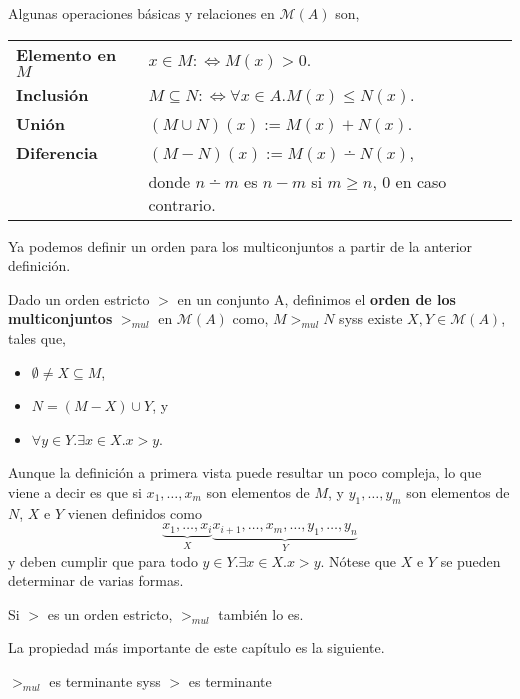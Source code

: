 \begin{defi} 
  Algunas operaciones básicas y relaciones en $\mathcal{M}(A)$ son, \\
  \begin{tabular}{ll}
    \textbf{Elemento en $M$}
    & $x \in M :\Leftrightarrow M(x) > 0$. \\
    \textbf{Inclusión}     
    & $M \subseteq N :\Leftrightarrow \forall x \in A. M(x) \leq N(x)$. \\ 
    \textbf{Unión}        
    & $(M \cup N)(x) := M(x) + N(x)$.   \\ 
    \textbf{Diferencia}   
    & $(M - N)(x):= M(x) \dotminus N(x)$, \\ 
    & donde $n \dotminus m$ es $n-m$
      si $m \geq n$, 0 en caso contrario.     
  \end{tabular}
\end{defi}

Ya podemos definir un orden para los multiconjuntos a partir de la anterior
definición.

\begin{defi} 
  Dado un orden estricto $>$ en un conjunto A, definimos el \textbf{orden de los
  multiconjuntos} $>_{mul}$ en $\mathcal{M}(A)$ como, $M >_{mul} N$ syss existe
  $X, Y \in \mathcal{M}(A)$, tales que,
  \begin{itemize}
  \item $\emptyset \neq X \subseteq M$,
  \item $N = (M - X) \cup Y$, y 
  \item $\forall y \in Y. \exists x \in X. x>y$.
  \end{itemize}
\end{defi}

Aunque la definición a primera vista puede resultar un poco compleja, lo que
viene a decir es que si $x_1, \dots, x_m$ son elementos de $M$, y
$y_1, \dots, y_m$ son elementos de $N$, $X$ e $Y$ vienen definidos como
\[ \underbrace{x_1, \dots, x_i}_{X} 
   \underbrace{x_{i+1}, \dots, x_m, \dots, y_1, \dots, y_n}_{Y} \] 
y deben cumplir que para todo $y \in Y. \exists x \in X. x>y$. Nótese que $X$
e $Y$ se pueden determinar de varias formas.

\begin{lema}
  Si $>$ es un orden estricto, $>_{mul}$ también lo es.
\end{lema}

La propiedad más importante de este capítulo es la siguiente.

\begin{teor}
  $>_{mul}$ es terminante syss $>$ es terminante
\end{teor}

